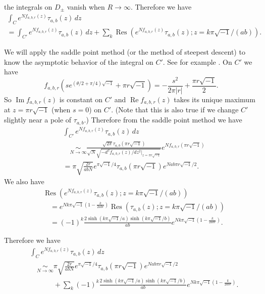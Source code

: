 \documentclass[a4paper,draft]{amsart}
\theoremstyle{plain}
\theoremstyle{definition}
\theoremstyle{remark}
\newcommand{\Res}{\operatorname{Res}}
\renewcommand{\Re}{\operatorname{Re}}
\renewcommand{\Im}{\operatorname{Im}}
\numberwithin{equation}{section}
\begin{document}
the integrals on $D_{\pm}$ vanish when $R\to\infty$.
Therefore we have
\begin{multline*}
  \int_{C}
  e^{Nf_{a,b,r}(z)}\tau_{a,b}(z)\,dz
  \\
  =
  \int_{C'}
  e^{Nf_{a,b,r}(z)}\tau_{a,b}(z)\,dz
  +
  \sum_{k}
  \Res
  \left(
    e^{Nf_{a,b,r}(z)}\tau_{a,b}(z);z=k\pi\sqrt{-1}/(ab)
  \right).
\end{multline*}
\par
We will apply the saddle point method (or the method of steepest descent)
to know the asymptotic behavior of the integral on $C'$.
See for example \cite[Theorem 7.2.9]{Marsden/Hoffman:Complex_Analysis}.
On $C'$ we have
\begin{equation*}
  f_{a,b,r}\left(se^{(\theta/2+\pi/4)\sqrt{-1}}+\pi{r}\sqrt{-1}\right)
  =
  -\frac{s^2}{2\pi|r|}+\frac{\pi{r}\sqrt{-1}}{2}.
\end{equation*}
So $\Im{f_{a,b,r}(z)}$ is constant on $C'$ and $\Re{f_{a,b,r}(z)}$ takes its
unique maximum at $z=\pi{r}\sqrt{-1}$ (when $s=0$) on $C'$.
(Note that this is also true if we change $C'$ slightly near a pole of
$\tau_{a,b}$.)
Therefore from the saddle point method we have
\begin{equation*}
\begin{split}
  &
  \int_{C'}
  e^{Nf_{a,b,r}(z)}\tau_{a,b}(z)\,dz
  \\
  &\quad\underset{N\to\infty}{\sim}
  \frac{\sqrt{2\pi}\tau_{a,b}(\pi{r}\sqrt{-1})}
       {\sqrt{N}\sqrt{-d^2f_{a,b,r}(z)/dz^2\big|_{z=\pi{r}\sqrt{-1}}}}
  e^{Nf_{a,b,r}(\pi{r}\sqrt{-1})}
  \\
  &=
  \pi\sqrt{\frac{2r}{abN}}e^{\pi\sqrt{-1}/4}
  \tau_{a,b}(\pi{r}\sqrt{-1})
  e^{Nab\pi{r}\sqrt{-1}/2}.
\end{split}
\end{equation*}
We also have
\begin{equation*}
\begin{split}
  &
  \Res
  \left(
    e^{Nf_{a,b,r}(z)}\tau_{a,b}(z);z=k\pi\sqrt{-1}/(ab)
  \right)
  \\
  &\quad=
  e^{Nk\pi\sqrt{-1}\left(1-\frac{k}{2abr}\right)}
  \Res\left(\tau_{a,b}(z);z=k\pi\sqrt{-1}/(ab)\right)
  \\
  &\quad=
  (-1)^k
  \frac{2\sinh(k\pi\sqrt{-1}/a)\sinh(k\pi\sqrt{-1}/b)}{ab}
  e^{Nk\pi\sqrt{-1}\left(1-\frac{k}{2abr}\right)}.
\end{split}
\end{equation*}
\par
Therefore we have
\begin{equation}\label{eq:asymptotic}
\begin{split}
  &\int_{C}
  e^{Nf_{a,b,r}(z)}\tau_{a,b}(z)\,dz
  \\
  &\quad\underset{N\to\infty}{\sim}
  \pi\sqrt{\frac{2r}{abN}}e^{\pi\sqrt{-1}/4}
  \tau_{a,b}(\pi{r}\sqrt{-1})
  e^{Nab\pi{r}\sqrt{-1}/2}
  \\
  &\quad\phantom{\underset{N\to\infty}{\sim}}
  +
  \sum_{k}
  (-1)^k
  \frac{2\sinh(k\pi\sqrt{-1}/a)\sinh(k\pi\sqrt{-1}/b)}{ab}
  e^{Nk\pi\sqrt{-1}\left(1-\frac{k}{2abr}\right)}.
\end{split}
\end{equation}
\end{document}
